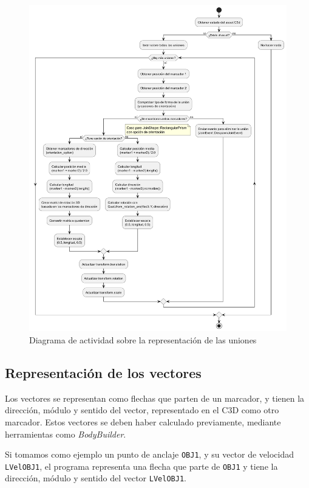 \begin{figure}[H]
  \centering
  \includegraphics[width=\textwidth]{imagenes/diagramas/uniones.png}
  \caption{Diagrama de actividad sobre la representación de las uniones}
  \label{fig:diag-uniones}
\end{figure}

\subsection{Representación de los vectores} \label{sec:representacion-vectores}

Los vectores se representan como flechas que parten de un marcador, y tienen la dirección, módulo y sentido del vector, representado en el \ac{C3D} como otro marcador. Estos vectores se deben haber calculado previamente, mediante herramientas como \textit{BodyBuilder}.

Si tomamos como ejemplo un punto de anclaje \texttt{OBJ1}, y su vector de velocidad \texttt{LVelOBJ1}, el programa representa una flecha que parte de \texttt{OBJ1} y tiene la dirección, módulo y sentido del vector \texttt{LVelOBJ1}.

